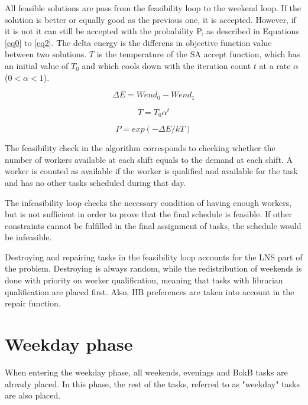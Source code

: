 All feasible solutions are pass from the feasibility loop to the weekend loop. If the solution is better or equally good as the previous one, it is accepted. However, if it is not it can still be accepted with the probability P, as described in Equations \ref{eq0} to \ref{eq2}. The delta energy is the differens in objective function value between two solutions. $T$ is the temperature of the SA accept function, which has an initial value of $T_0$ and which cools down with the iteration count  $t$ at a rate $\alpha$ ($0 < \alpha < 1$).

\begin{equation}
\Delta E = Wend_0 - Wend_1
\label{eq1}
\end{equation}

\begin{equation}
T = T_0 \alpha^t
\label{eq2}
\end{equation}

\begin{equation}
P = exp(-\Delta E /kT)
\label{eq0}
\end{equation}

The feasibility check in the algorithm corresponds to checking whether the number of workers available at each shift equals to the demand at each shift. A worker is counted as available if the worker is qualified and available for the task and has no other tasks scheduled during that day.

The infeasibility loop checks the necessary condition of having enough workers, but is not sufficient in order to prove that the final schedule is feasible. If other constraints cannot be fulfilled in the final assignment of tasks, the schedule would be infeasible.

Destroying and repairing tasks in the  feasibility loop accounts for the LNS part of the problem. Destroying is always random, while the redistribution of weekends is done with priority on worker qualification, meaning that tasks with librarian qualification are placed first. Also, HB preferences are taken into account in the repair function.

\section{Weekday phase}

When entering the weekday phase, all weekends, evenings and BokB tasks are already placed. In this phase, the rest of the tasks, referred to as "weekday" tasks are also placed.


